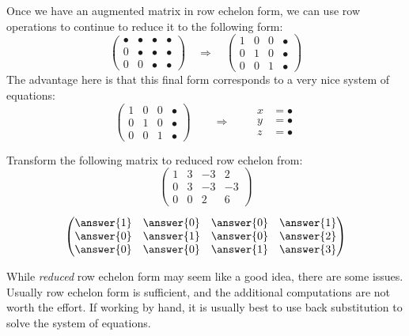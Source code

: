 \documentclass{ximera}
\begin{document}
Once we have an augmented matrix in row echelon form, we can use row
operations to continue to reduce it to the following form:
\[
\begin{pmatrix}
  \bullet & \bullet & \bullet & \bullet \\
     0   & \bullet & \bullet & \bullet \\
     0  &    0 & \bullet & \bullet 
\end{pmatrix}
\quad
\Rightarrow
\quad
\begin{pmatrix}
  1 & 0 & 0  & \bullet \\
     0   & 1  &  0 & \bullet \\
     0  &    0 & 1 & \bullet 
\end{pmatrix}
\]
The advantage here is that this final form corresponds to a very nice system of equations:
\[
\left(\begin{array}{ccc|c}
  1 &   0 & 0 & \bullet  \\
  0 &   1 & 0 & \bullet \\
   0& 0  &  1 & \bullet
\end{array}\right)
\qquad\Longrightarrow\qquad
\begin{aligned}
      x &= \bullet  \\
      y &= \bullet  \\
      z &=\bullet 
\end{aligned}
\]
\begin{question}
  Transform the following matrix to reduced row echelon from:
  \[
  \begin{pmatrix}
  1 & 3 & -3 & 2  \\
  0 & 3 & -3 & -3 \\
  0 & 0 &  2 & 6
  \end{pmatrix}
  \]
  \begin{prompt}
    \[
    \begin{pmatrix}
      \answer{1} & \answer{0} & \answer{0} & \answer{1} \\
      \answer{0} & \answer{1} & \answer{0} & \answer{2} \\
      \answer{0} & \answer{0} & \answer{1} & \answer{3} 
    \end{pmatrix}
    \]
  \end{prompt}
\end{question}
While \textit{reduced} row echelon form may seem like a good idea,
there are some issues.  Usually row echelon form is sufficient, and
the additional computations are not worth the effort.  If working by
hand, it is usually best to use back substitution to solve the system of equations.
\end{document}
